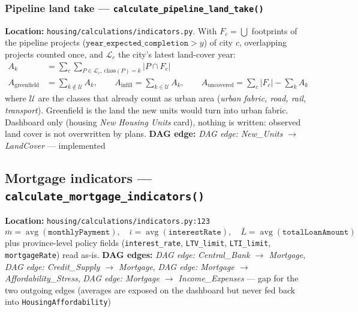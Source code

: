 \documentclass[11pt]{article}
\newcommand{\code}[1]{\texttt{#1}}
\newcommand{\dagedge}[1]{\textit{DAG edge: #1}}
\newcommand{\statusdone}{\textcolor{green!50!black}{implemented}}
\newcommand{\statusgap}{\textcolor{red!70!black}{gap}}
\begin{document}
\subsubsection{Pipeline land take --- \code{calculate\_pipeline\_land\_take()}}
\label{sec:pipeline-land-take}
\textbf{Location:} \code{housing/calculations/indicators.py}. With $F_c = \bigcup$ footprints of the pipeline projects ($\texttt{year\_expected\_completion} > y$) of city $c$, overlapping projects counted once, and $\mathcal{L}_c$ the city's latest land-cover year:
\begin{align}
  A_k &= \sum_c \sum_{P \in \mathcal{L}_c,\ \text{class}(P) = k} |P \cap F_c| \\
  A_{\text{greenfield}} &= \sum_{k \notin \mathcal{U}} A_k, \qquad A_{\text{infill}} = \sum_{k \in \mathcal{U}} A_k, \qquad A_{\text{uncovered}} = \textstyle\sum_c |F_c| - \sum_k A_k
\end{align}
where $\mathcal{U}$ are the classes that already count as urban area (\emph{urban fabric, road, rail, transport}). Greenfield is the land the new units would turn into urban fabric. Dashboard only (housing \emph{New Housing Units} card), nothing is written: observed land cover is not overwritten by plans. \textbf{DAG edge:} \dagedge{New\_Units $\rightarrow$ LandCover} --- \statusdone{}

\subsection{Mortgage indicators --- \code{calculate\_mortgage\_indicators()}}
\textbf{Location:} \code{housing/calculations/indicators.py:123}
\begin{equation}
  \overline{m} = \operatorname{avg}(\texttt{monthlyPayment}), \quad
  \bar{\iota} = \operatorname{avg}(\texttt{interestRate}), \quad
  \overline{L} = \operatorname{avg}(\texttt{totalLoanAmount})
\end{equation}
plus province-level policy fields (\code{interest\_rate}, \code{LTV\_limit}, \code{LTI\_limit}, \code{mortgageRate}) read as-is. \textbf{DAG edges:} \dagedge{Central\_Bank $\rightarrow$ Mortgage}, \dagedge{Credit\_Supply $\rightarrow$ Mortgage}, \dagedge{Mortgage $\rightarrow$ Affordability\_Stress}, \dagedge{Mortgage $\rightarrow$ Income\_Expenses} --- \statusgap{} for the two outgoing edges (averages are exposed on the dashboard but never fed back into \code{HousingAffordability})
\end{document}
